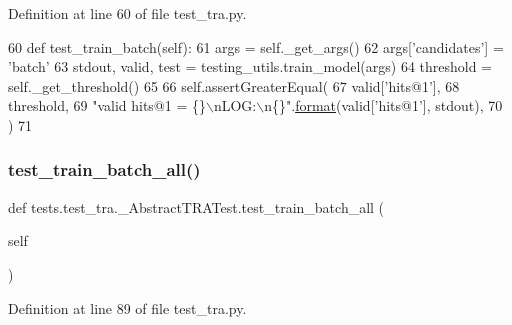 Definition at line 60 of file test\+\_\+tra.\+py.


\begin{DoxyCode}
60     \textcolor{keyword}{def }test\_train\_batch(self):
61         args = self.\_get\_args()
62         args[\textcolor{stringliteral}{'candidates'}] = \textcolor{stringliteral}{'batch'}
63         stdout, valid, test = testing\_utils.train\_model(args)
64         threshold = self.\_get\_threshold()
65 
66         self.assertGreaterEqual(
67             valid[\textcolor{stringliteral}{'hits@1'}],
68             threshold,
69             \textcolor{stringliteral}{"valid hits@1 = \{\}\(\backslash\)nLOG:\(\backslash\)n\{\}"}.\hyperlink{namespaceparlai_1_1chat__service_1_1services_1_1messenger_1_1shared__utils_a32e2e2022b824fbaf80c747160b52a76}{format}(valid[\textcolor{stringliteral}{'hits@1'}], stdout),
70         )
71 
\end{DoxyCode}
\mbox{\label{classtests_1_1test__tra_1_1__AbstractTRATest_a5e0358ae47540ed9b0583e75ac1d9a49}} 
\subsubsection{\texorpdfstring{test\+\_\+train\+\_\+batch\+\_\+all()}{test\_train\_batch\_all()}}
{\footnotesize\ttfamily def tests.\+test\+\_\+tra.\+\_\+\+Abstract\+T\+R\+A\+Test.\+test\+\_\+train\+\_\+batch\+\_\+all (\begin{DoxyParamCaption}\item[{}]{self }\end{DoxyParamCaption})}



Definition at line 89 of file test\+\_\+tra.\+py.


